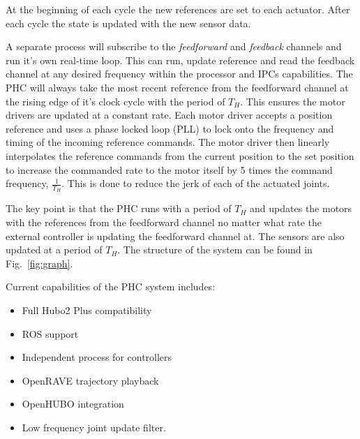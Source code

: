 At the beginning of each cycle the new references are set to each actuator.  
After each cycle the state is updated with the new sensor data.

A separate process will subscribe to the \textit{feedforward} and \textit{feedback} channels and run it's own real-time loop.  
This can run, update reference and read the feedback channel at any desired frequency within the processor and IPCs capabilities.
The PHC will always take the most recent reference from the feedforward channel at the rising edge of it's clock cycle with the period of $T_H$.
This ensures the motor drivers are updated at a constant rate. 
Each motor driver accepts a position reference and uses a phase locked loop (PLL) to lock onto the frequency and timing of the incoming reference commands.
The motor driver then linearly interpolates the reference commands from the current position to the set position to increase the commanded rate to the motor itself by 5 times the command frequency, $\frac{1}{T_H}$.
This is done to reduce the jerk of each of the actuated joints.

The key point is that the PHC runs with a period of $T_H$ and updates the motors with the references from the feedforward channel no matter what rate the external controller is updating the feedforward channel at.  
The sensors are also updated at a period of $T_H$.
The structure of the system can be found in Fig.~\ref{fig:graph}.



Current capabilities of the PHC system includes:

\begin{itemize}
\item Full Hubo2 Plus compatibility 
\item ROS support
\item Independent process for controllers
\item OpenRAVE trajectory playback
\item OpenHUBO integration 
\item Low frequency joint update filter.
\end{itemize}




